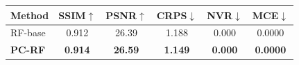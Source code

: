 \begin{tabular}{lccccc}
\toprule
\textbf{Method} & SSIM$\uparrow$ & PSNR$\uparrow$ & CRPS$\downarrow$ & NVR$\downarrow$ & MCE$\downarrow$ \\
\midrule
RF-base & 0.912 & 26.39 & 1.188 & 0.000 & 0.0000 \\
\textbf{PC-RF} & \textbf{0.914} & \textbf{26.59} & \textbf{1.149} & \textbf{0.000} & \textbf{0.0000} \\
\bottomrule
\end{tabular}
